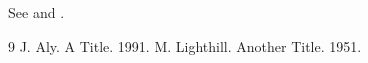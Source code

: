 \documentclass{klucite}
\begin{document}
See \cite{a} and \cite{b}.
\begin{thebibliography}{9}
 J. Aly. A Title. 1991.
 M. Lighthill. Another Title. 1951.
\end{thebibliography}
\end{document}
